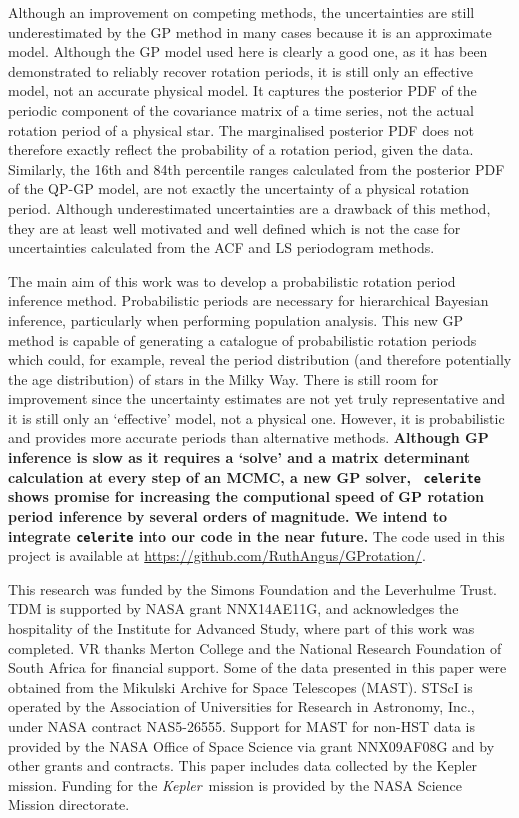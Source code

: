 \documentclass[a4paper,fleqn,usenatbib,useAMS]{mnras}
\newcommand{\Kepler}{{\it Kepler}}
\begin{document}
Although an improvement on competing methods, the uncertainties are still
underestimated by the GP method in many cases because it is an approximate
model.
Although the GP model used here is clearly a good one, as it has been
demonstrated to reliably recover rotation periods, it is still only an
effective model, not an accurate physical model.
It captures the posterior PDF of the periodic component of the covariance
matrix of a time series, not the actual rotation period of a physical star.
The marginalised posterior PDF does not therefore exactly reflect the
probability of a rotation period, given the data.
Similarly, the 16th and 84th percentile ranges calculated from the posterior
PDF of the QP-GP model, are not exactly the uncertainty of a physical
rotation period.
Although underestimated uncertainties are a drawback of this method, they are
at least well motivated and well defined which is not the case for
uncertainties calculated from the ACF and LS periodogram methods.

The main aim of this work was to develop a probabilistic rotation period
inference method.
Probabilistic periods are necessary for hierarchical Bayesian inference,
particularly when performing population analysis.
This new GP method is capable of generating a catalogue of probabilistic
rotation periods which could, for example, reveal the period distribution
(and therefore potentially the age distribution) of stars in the Milky Way.
There is still room for improvement since the uncertainty estimates are not
yet truly representative and it is still only an `effective' model, not a
physical one.
However, it is probabilistic and provides more accurate periods than
alternative methods.
{\bf Although GP inference is slow as it requires a `solve' and a matrix
determinant calculation at every step of an MCMC, a new GP solver, {\tt
celerite} \citep{Foremanmackey2017} shows promise for increasing the
computional speed of GP rotation period inference by several orders of
magnitude.
We intend to integrate {\tt celerite} into our code in the near future.}
The code used in this project is available at
\url{https://github.com/RuthAngus/GProtation/}.

This research was funded by the Simons Foundation and the Leverhulme Trust.
TDM is supported by NASA grant NNX14AE11G, and acknowledges the
hospitality of the Institute for Advanced Study,
where part of this work was completed.
VR thanks Merton College and the National Research Foundation of South Africa
for financial support.
Some of the data presented in this paper were obtained from the Mikulski
Archive for Space Telescopes (MAST).
STScI is operated by the Association of Universities for Research in
Astronomy, Inc., under NASA contract NAS5-26555.
Support for MAST for non-HST data is provided by the NASA Office of Space
Science via grant NNX09AF08G and by other grants and contracts.
This paper includes data collected by the Kepler mission. Funding for the
\Kepler\ mission is provided by the NASA Science Mission directorate.



\end{document}
